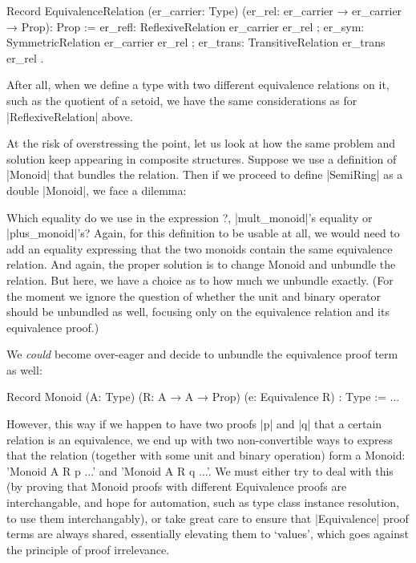\documentclass[a4paper,10pt, runningheads]{llncs}
\begin{document}
\begin{code}
Record EquivalenceRelation (er_carrier: Type)
                             (er_rel: er_carrier → er_carrier → Prop): Prop :=
  { er_refl: ReflexiveRelation er_carrier er_rel
  ; er_sym: SymmetricRelation er_carrier er_rel
  ; er_trans: TransitiveRelation er_trans er_rel }.
\end{code}

After all, when we define a type with
two different equivalence relations on it,
such as the quotient of a setoid,
we have the same considerations as for |ReflexiveRelation| above.

At the risk of overstressing the point, let us look at how the same problem and solution keep
appearing in composite structures. Suppose we use a definition of |Monoid| that bundles the
relation. Then if we proceed to define |SemiRing| as a double |Monoid|, we face a dilemma:
\begin{code}
  Record SemiRing A: Type :=
    { mult_monoid: Monoid A 
    ; plus_monoid: Monoid A 
    ; plus_comm: Commutative (mon_op plus_monoid)
    ; mult_comm: Commutative (mon_op mult_monoid)
    ; mult_0_l: Π x: A, ?
\end{code}
Which equality do we use in the expression ?, |mult_monoid|'s equality or |plus_monoid|'s?
Again, for this definition to be usable at all, we would need to add an equality expressing that the
two monoids contain the same equivalence relation. And again, the proper solution is to change
Monoid and unbundle the relation. But here, we have a choice as to how much we unbundle exactly.
(For the moment we ignore the question of whether the unit and binary operator should be unbundled
as well, focusing only on the equivalence relation and its equivalence proof.)

We \emph{could} become over-eager and decide to unbundle the equivalence proof term as well:
\begin{code}
Record Monoid (A: Type) (R: A → A → Prop)
  (e: Equivalence R) : Type := ...
\end{code}
However, this way if we happen to have two proofs |p| and |q| that a certain relation is an
equivalence, we end up with two non-convertible ways to express that the relation (together with
some unit and binary operation) form a Monoid: 'Monoid A R p ...' and 'Monoid A R q ...'. We must
either try to deal with this (by proving that Monoid proofs with different Equivalence proofs are
interchangable, and hope for automation, such as type class instance resolution, to use them
interchangably), or take great care to ensure that |Equivalence| proof terms are always shared,
essentially elevating them to `values', which goes against the principle of proof
irrelevance.
\end{document}

